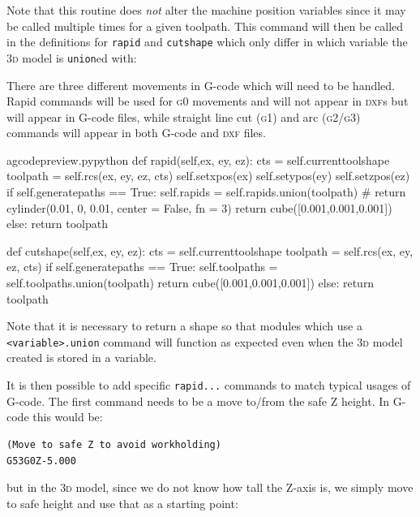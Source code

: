 \documentclass{ltxdoc}
\begin{document}
\noindent Note that this routine does \emph{not} alter the machine position variables since it may be called multiple times for a given toolpath. This command will then be called in the definitions for \verb|rapid| and \verb|cutshape| which only differ in which variable the \textsc{3d} model is \verb|union|ed with:

There are three different movements in G-code which will need to be handled. Rapid commands will be used for \textsc{g0} movements and will not appear in \textsc{dxf}s but will appear in G-code files, while straight line cut (\textsc{g1}) and arc (\textsc{g2/g3}) commands will appear in both G-code and \textsc{dxf} files. 

\lstset{firstnumber=\thegcpy}
\begin{writecode}{a}{gcodepreview.py}{python}
    def rapid(self,ex, ey, ez):
        cts = self.currenttoolshape
        toolpath = self.rcs(ex, ey, ez, cts)
        self.setxpos(ex)
        self.setypos(ey)
        self.setzpos(ez)
        if self.generatepaths == True:
            self.rapids = self.rapids.union(toolpath)
#            return cylinder(0.01, 0, 0.01, center = False, fn = 3)
            return cube([0.001,0.001,0.001])
        else:
            return toolpath

    def cutshape(self,ex, ey, ez):
        cts = self.currenttoolshape
        toolpath = self.rcs(ex, ey, ez, cts)
        if self.generatepaths == True:
            self.toolpaths = self.toolpaths.union(toolpath)
            return cube([0.001,0.001,0.001])
        else:
            return toolpath

\end{writecode}
\addtocounter{gcpy}{22}

Note that it is necessary to return a shape so that modules which use a \verb|<variable>.union| command will function as expected even when the \textsc{3d} model created is stored in a variable.

It is then possible to add specific \verb|rapid...| commands to match typical usages of G-code. The first command needs to be a move to/from the safe Z height. In G-code this would be:

\begin{verbatim}
(Move to safe Z to avoid workholding)
G53G0Z-5.000
\end{verbatim}

\noindent but in the \textsc{3d} model, since we do not know how tall the Z-axis is, we simply move to safe height and use that as a starting point:
\end{document}
